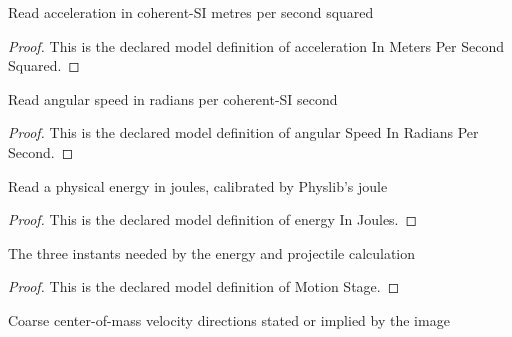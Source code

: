 \begin{definition}
  \label{def:physics:phyx-mini-0788:phyxminiproblems-problemphyxmini0788-accelerationinmeterspersecondsquared}
  Read acceleration in coherent-SI metres per second squared
\end{definition}
\begin{proof}
  This is the declared model definition of acceleration In Meters Per Second Squared.
\end{proof}
\begin{definition}
  \label{def:physics:phyx-mini-0788:phyxminiproblems-problemphyxmini0788-angularspeedinradianspersecond}
  Read angular speed in radians per coherent-SI second
\end{definition}
\begin{proof}
  This is the declared model definition of angular Speed In Radians Per Second.
\end{proof}
\begin{definition}
  \label{def:physics:phyx-mini-0788:phyxminiproblems-problemphyxmini0788-energyinjoules}
  Read a physical energy in joules, calibrated by Physlib's joule
\end{definition}
\begin{proof}
  This is the declared model definition of energy In Joules.
\end{proof}
\begin{definition}
  \label{def:physics:phyx-mini-0788:phyxminiproblems-problemphyxmini0788-motionstage}
  The three instants needed by the energy and projectile calculation
\end{definition}
\begin{proof}
  This is the declared model definition of Motion Stage.
\end{proof}
\begin{definition}
  \label{def:physics:phyx-mini-0788:phyxminiproblems-problemphyxmini0788-motiondirection}
  Coarse center-of-mass velocity directions stated or implied by the image
\end{definition}
